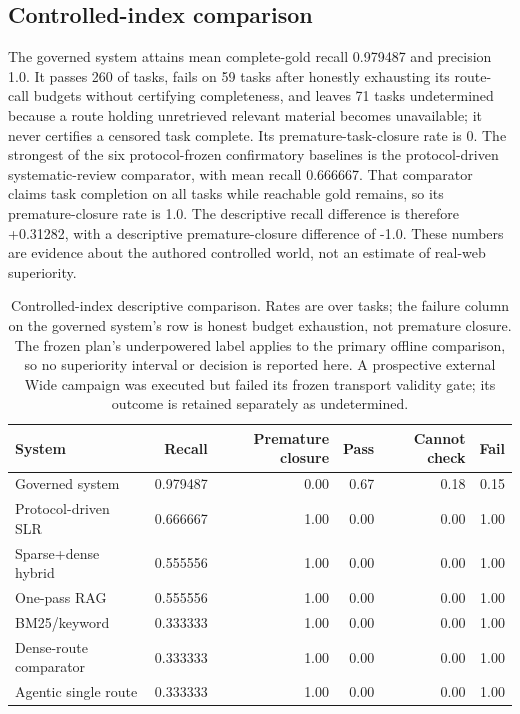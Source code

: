 \subsection{Controlled-index comparison}
The governed system attains mean complete-gold recall 0.979487 and precision 1.0.  It
passes 260 of \OfflineTaskCount{} tasks, fails on 59 tasks after honestly exhausting its
route-call budgets without certifying completeness, and leaves 71 tasks
undetermined because a route holding unretrieved relevant material becomes
unavailable; it never certifies a censored task complete.  Its premature-task-closure rate is
0.  The strongest of the six protocol-frozen confirmatory baselines is the
protocol-driven systematic-review comparator, with mean recall 0.666667.  That
comparator claims task completion on all \OfflineTaskCount{} tasks while reachable gold remains,
so its premature-closure rate is 1.0.  The descriptive recall difference is
therefore +0.31282, with a descriptive premature-closure difference of -1.0.
These numbers are evidence about the authored controlled world, not an estimate
of real-web superiority.

\begin{table}[t]
\centering
\small
\begin{tabular}{lrrrrr}
\hline
System & Recall & Premature closure & Pass & Cannot check & Fail \\
\hline
Governed system & 0.979487 & 0.00 & 0.67 & 0.18 & 0.15 \\
Protocol-driven SLR & 0.666667 & 1.00 & 0.00 & 0.00 & 1.00 \\
Sparse+dense hybrid & 0.555556 & 1.00 & 0.00 & 0.00 & 1.00 \\
One-pass RAG & 0.555556 & 1.00 & 0.00 & 0.00 & 1.00 \\
BM25/keyword & 0.333333 & 1.00 & 0.00 & 0.00 & 1.00 \\
Dense-route comparator & 0.333333 & 1.00 & 0.00 & 0.00 & 1.00 \\
Agentic single route & 0.333333 & 1.00 & 0.00 & 0.00 & 1.00 \\
\hline
\end{tabular}
\caption{Controlled-index descriptive comparison.  Rates are over \OfflineTaskCount{} tasks;
the failure column on the governed system's row is honest budget exhaustion, not
premature closure.  The frozen plan's underpowered label applies to the primary
offline comparison, so no superiority interval or decision is reported here.  A
prospective external Wide campaign was executed but failed its frozen transport
validity gate; its outcome is retained separately as undetermined.}
\label{tab:p2-offline-main}
\end{table}

